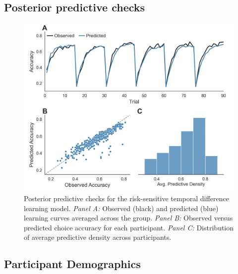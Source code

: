 \documentclass[a4paper,notitlepage,12pt]{article}
\begin{document}
\begin{refsection}[supp]
\clearpage

\subsection*{Posterior predictive checks}

\begin{figure}[H]
\includegraphics[width=16cm]{../figures/supp_02.png}
\centering
\captionsetup{width=0.88\textwidth}
\caption{Posterior predictive checks for the risk-sensitive temporal difference learning model. \textit{Panel A:} Observed (black) and predicted (blue) learning curves averaged across the group. \textit{Panel B:} Observed versus predicted choice accuracy for each participant. \textit{Panel C:} Distribution of average predictive density across participants.}
\label{fig:posterior_check}
\end{figure}

\clearpage

\subsection*{Participant Demographics}


\end{refsection}
\end{document}
